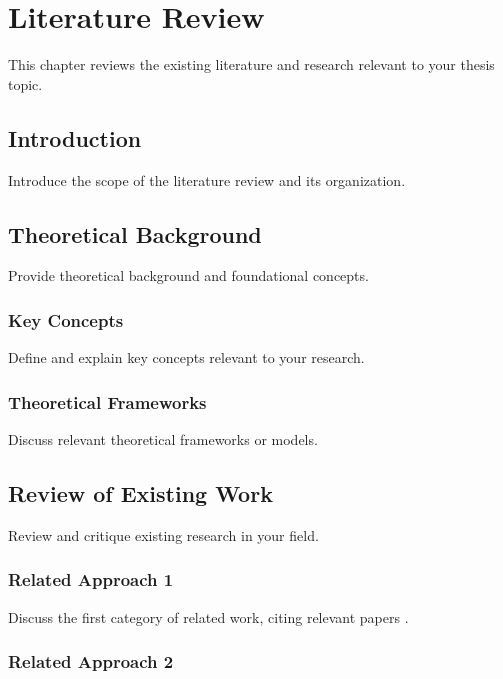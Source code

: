 \chapter{Literature Review}
\label{ch:literature-review}

This chapter reviews the existing literature and research relevant to your thesis topic.

\section{Introduction}
\label{sec:lit-introduction}

Introduce the scope of the literature review and its organization.

\section{Theoretical Background}
\label{sec:theoretical-background}

Provide theoretical background and foundational concepts.

\subsection{Key Concepts}
\label{subsec:key-concepts}

Define and explain key concepts relevant to your research.

\subsection{Theoretical Frameworks}
\label{subsec:theoretical-frameworks}

Discuss relevant theoretical frameworks or models.

\section{Review of Existing Work}
\label{sec:existing-work}

Review and critique existing research in your field.

\subsection{Related Approach 1}
\label{subsec:approach1}

Discuss the first category of related work, citing relevant papers \cite{example-citation}.

\subsection{Related Approach 2}
\label{subsec:approach2}

